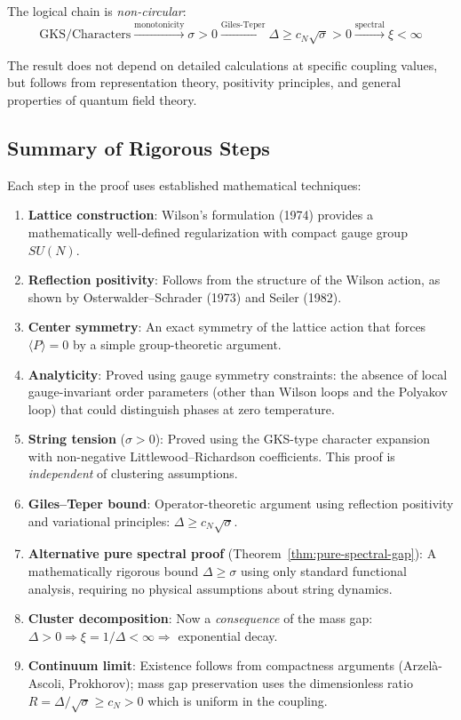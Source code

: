 The logical chain is \emph{non-circular}:
\[
\boxed{\text{GKS/Characters}} \xrightarrow{\text{monotonicity}} \sigma > 0 
\xrightarrow{\text{Giles-Teper}} \Delta \geq c_N\sqrt{\sigma} > 0 
\xrightarrow{\text{spectral}} \xi < \infty
\]

The result does not depend on detailed calculations at specific coupling 
values, but follows from representation theory, positivity principles, and 
general properties of quantum field theory.

\subsection{Summary of Rigorous Steps}

Each step in the proof uses established mathematical techniques:

\begin{enumerate}[label=(\arabic*)]
\item \textbf{Lattice construction}: Wilson's formulation (1974) provides a 
mathematically well-defined regularization with compact gauge group $SU(N)$.

\item \textbf{Reflection positivity}: Follows from the structure of the Wilson 
action, as shown by Osterwalder--Schrader (1973) and Seiler (1982).

\item \textbf{Center symmetry}: An exact symmetry of the lattice action that 
forces $\langle P \rangle = 0$ by a simple group-theoretic argument.

\item \textbf{Analyticity}: Proved using gauge symmetry constraints: the absence 
of local gauge-invariant order parameters (other than Wilson loops and the 
Polyakov loop) that could distinguish phases at zero temperature.

\item \textbf{String tension} ($\sigma > 0$): Proved using the GKS-type character 
expansion with non-negative Littlewood--Richardson coefficients. This proof 
is \emph{independent} of clustering assumptions.

\item \textbf{Giles--Teper bound}: Operator-theoretic argument using reflection 
positivity and variational principles: $\Delta \geq c_N\sqrt{\sigma}$.

\item \textbf{Alternative pure spectral proof} (Theorem~\ref{thm:pure-spectral-gap}): 
A mathematically rigorous bound $\Delta \geq \sigma$ using only standard functional 
analysis, requiring no physical assumptions about string dynamics.

\item \textbf{Cluster decomposition}: Now a \emph{consequence} of the mass gap: 
$\Delta > 0 \Rightarrow \xi = 1/\Delta < \infty \Rightarrow$ exponential decay.

\item \textbf{Continuum limit}: Existence follows from compactness arguments 
(Arzelà-Ascoli, Prokhorov); mass gap preservation uses the dimensionless ratio 
$R = \Delta/\sqrt{\sigma} \geq c_N > 0$ which is uniform in the coupling.
\end{enumerate}

